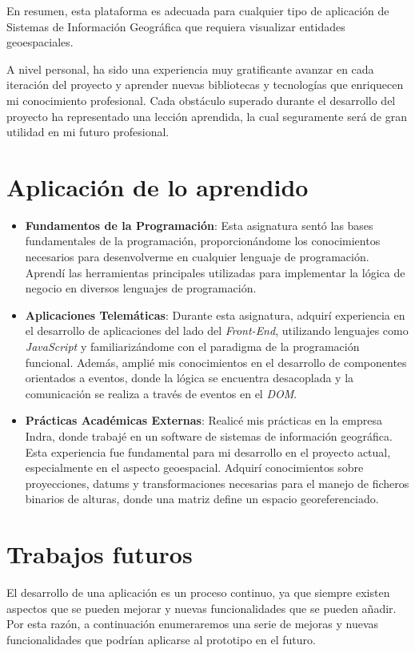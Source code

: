 \documentclass[a4paper, 11pt]{book}
\begin{document}
En resumen, esta plataforma es adecuada para cualquier tipo de aplicación de Sistemas de Información Geográfica que requiera visualizar entidades geoespaciales.

A nivel personal, ha sido una experiencia muy gratificante avanzar en cada iteración del proyecto y aprender nuevas bibliotecas y tecnologías que enriquecen mi conocimiento profesional. Cada obstáculo superado durante el desarrollo del proyecto ha representado una lección aprendida, la cual seguramente será de gran utilidad en mi futuro profesional.
\section{Aplicación de lo aprendido}
\label{sec:aplicacion}
\begin{itemize}
	\item \textbf{Fundamentos de la Programación}: Esta asignatura sentó las bases fundamentales de la programación, proporcionándome los conocimientos necesarios para desenvolverme en cualquier lenguaje de programación. Aprendí las herramientas principales utilizadas para implementar la lógica de negocio en diversos lenguajes de programación.
	\item \textbf{Aplicaciones Telemáticas}: Durante esta asignatura, adquirí experiencia en el desarrollo de aplicaciones del lado del \emph{Front-End}, utilizando lenguajes como \emph{JavaScript} y familiarizándome con el paradigma de la programación funcional. Además, amplié mis conocimientos en el desarrollo de componentes orientados a eventos, donde la lógica se encuentra desacoplada y la comunicación se realiza a través de eventos en el \emph{\gls{DOM}}.
	\item \textbf{Prácticas Académicas Externas}: Realicé mis prácticas en la empresa Indra, donde trabajé en un software de sistemas de información geográfica. Esta experiencia fue fundamental para mi desarrollo en el proyecto actual, especialmente en el aspecto \gls{geoespacial}. Adquirí conocimientos sobre proyecciones, datums y transformaciones necesarias para el manejo de ficheros binarios de alturas, donde una matriz define un espacio georeferenciado.
\end{itemize}
\section{Trabajos futuros}
\label{sec:trabajos_futuros}
El desarrollo de una aplicación es un proceso continuo, ya que siempre existen aspectos que se pueden mejorar y nuevas funcionalidades que se pueden añadir. Por esta razón, a continuación enumeraremos una serie de mejoras y nuevas funcionalidades que podrían aplicarse al prototipo en el futuro.
\end{document}
